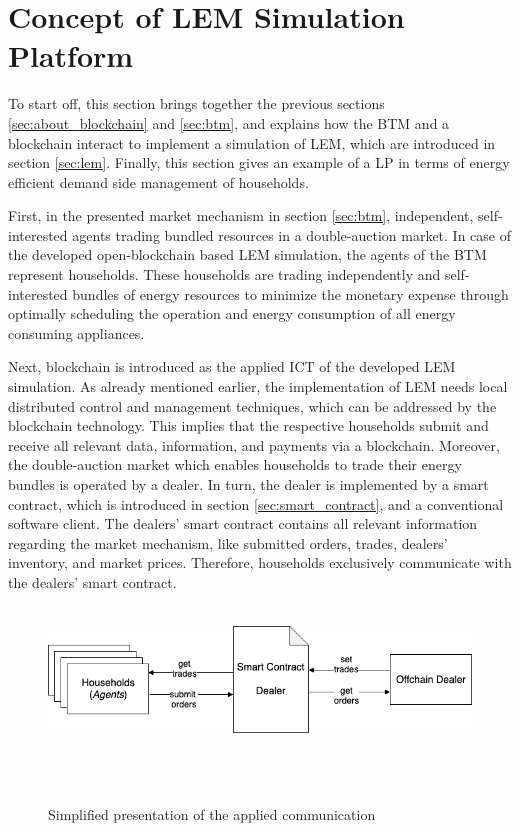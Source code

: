 \section{Concept of LEM Simulation Platform}
\label{sec:concept_of_lem}
To start off, this section brings together the previous sections \ref{sec:about_blockchain} and \ref{sec:btm},
and explains how the BTM and a blockchain interact to implement a simulation 
of LEM, which are introduced in section \ref{sec:lem}.
Finally, this section gives an example of a LP in terms of energy efficient demand side management of households. 

First, in the presented market mechanism in section \ref{sec:btm}, independent, self-interested agents trading bundled resources
in a double-auction market. 
In case of the developed open-blockchain based LEM simulation, the agents of the BTM represent households. 
These households are trading independently and self-interested bundles of energy resources 
to minimize the monetary expense through optimally scheduling the operation and energy consumption 
of all energy consuming appliances.

Next, blockchain is introduced as the applied ICT of the developed LEM simulation. 
As already mentioned earlier, the implementation of LEM needs 
local distributed control and management techniques, which can be addressed by the blockchain technology.
This implies that the respective households submit and receive all relevant data, information, and payments via a blockchain. 
Moreover, the double-auction market which enables households to trade their energy bundles is operated by a dealer.
In turn, the dealer is implemented by a smart contract, which is introduced in section \ref{sec:smart_contract}, and a conventional software client. 
The dealers' smart contract contains all relevant information regarding the market mechanism, like submitted orders, trades, 
dealers' inventory, and market prices. 
Therefore, households exclusively communicate with the dealers' smart contract. 

\begin{figure}[htbp]
    \centering
    \includegraphics[width=.7\linewidth]{./figures/concept_lem.png}
    \caption{Simplified presentation of the applied communication}
    \label{figure:concept_lem}
\end{figure}

